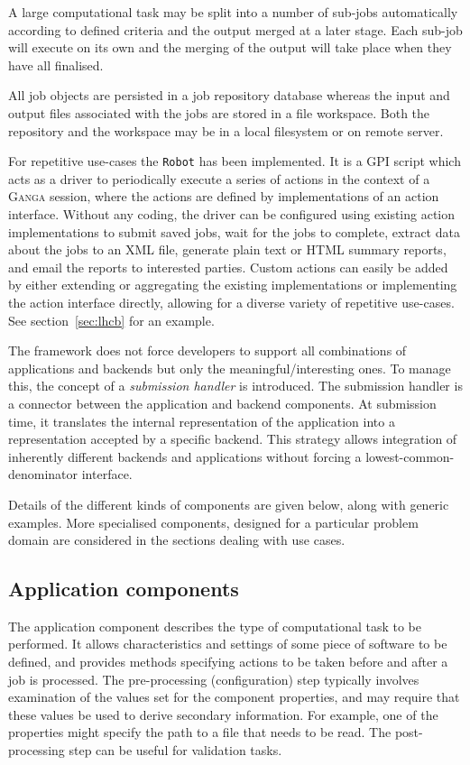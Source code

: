 \documentclass{elsart}
\def\ganga {\textsc{Ganga}\xspace}
\def\GPI{GPI\xspace}
\newcommand{\code}[1]{\texttt{#1}}
\begin{document}
A large computational task may be split into a number of sub-jobs automatically
according to defined criteria and the output merged at a later stage. Each
sub-job will execute on its own and the merging of the output will take place
when they have all finalised.

All job objects are persisted in a job repository database whereas the input
and output files associated with the jobs are stored in a file workspace. Both
the repository and the workspace may be in a local filesystem or on remote
server.

For repetitive use-cases the \code{Robot} has been implemented. It is a \GPI
script which acts as a driver to periodically execute a series of
actions in the context of a \ganga session, where the actions are defined by
implementations of an action interface.  Without any coding, the driver can be
configured using existing action implementations to submit saved jobs, wait
for the jobs to complete, extract data about the jobs to an XML file, generate
plain text or HTML summary reports, and email the reports to interested
parties. Custom actions can easily be added by either extending or aggregating
the existing implementations or implementing the action interface directly,
allowing for a diverse variety of repetitive use-cases. See
section~\ref{sec:lhcb} for an example.

The framework does not force developers to support all combinations of
applications and backends but only the meaningful/interesting ones. To manage
this, the concept of a {\em submission handler} is introduced. The submission
handler is a connector between the application and backend components. At
submission time, it translates the internal representation of the application
into a representation accepted by a specific backend. This strategy allows
integration of inherently different backends and applications without forcing
a lowest-common-denominator interface.

Details of the different kinds of components are given below, along with
generic examples. More specialised components, designed for a particular
problem domain are considered in the sections dealing with use cases.

\subsection{Application components}
The application component describes the type of computational task to be
performed.  It allows characteristics and settings of some
piece of software to be defined, and provides methods specifying actions to be
taken before and after a job is processed.  The pre-processing (configuration)
step typically involves examination of the values set for the component
properties, and may require that these values be used to derive secondary
information.  For example, one of the properties might specify the path to a
file that needs to be read.  The post-processing step can be useful for
validation tasks.
\end{document}
